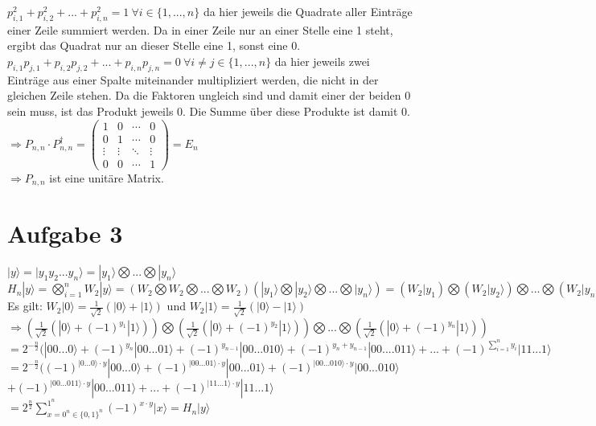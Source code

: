 \documentclass[a4paper]{scrartcl}
\begin{document}
$p_{i,1}^2+p_{i,2}^2+...+p_{i,n}^2=1~\forall i \in \{1,...,n\}$ da hier jeweils die Quadrate aller Einträge einer Zeile summiert werden. Da in einer Zeile nur an einer Stelle eine 1 steht, ergibt das Quadrat nur an dieser Stelle eine 1, sonst eine 0.\\
$p_{i,1}p_{j,1}+p_{i,2}p_{j,2}+...+p_{i,n}p_{j,n} = 0~\forall i\neq j \in \{1,...,n\}$ da hier jeweils zwei Einträge aus einer Spalte miteinander multipliziert werden, die nicht in der gleichen Zeile stehen. Da die Faktoren ungleich sind und damit einer der beiden 0 sein muss, ist das Produkt jeweils 0. Die Summe über diese Produkte ist damit 0.\\
$\Rightarrow P_{n,n} \cdot P_{n,n}^{\dagger} =
\begin{pmatrix}
1 & 0 & \cdots & 0 \\
0 & 1 & \cdots & 0 \\
\vdots  & \vdots  & \ddots & \vdots  \\
0 & 0 & \cdots & 1 
\end{pmatrix} = E_n$\\
$\Rightarrow P_{n,n}$ ist eine unitäre Matrix.

\newpage
\section*{Aufgabe 3}
$|y\rangle = |y_1 y_2...y_n\rangle = |y_1\rangle \bigotimes ... \bigotimes |y_n\rangle$\\
$H_n|y\rangle =\bigotimes_{i=1}^nW_2|y\rangle =(W_2\bigotimes W_2\bigotimes ... \bigotimes W_2)(|y_1\rangle \bigotimes |y_2\rangle \bigotimes ... \bigotimes |y_n\rangle) = (W_2|y_1)\bigotimes (W_2|y_2\rangle)\bigotimes ... \bigotimes (W_2|y_n\rangle)$\\
Es gilt: $W_2|0\rangle = \frac{1}{\sqrt{2}}(|0\rangle + |1\rangle)$ und $W_2|1\rangle = \frac{1}{\sqrt{2}}(|0\rangle - |1\rangle)$\\
$\Rightarrow (\frac{1}{\sqrt{2}}(|0\rangle + (-1)^{y_1}|1\rangle ))\bigotimes (\frac{1}{\sqrt{2}}(|0\rangle + (-1)^{y_2} |1\rangle)) \bigotimes ... \bigotimes (\frac{1}{\sqrt{2}}(|0\rangle + (-1)^{y_n}|1\rangle))$\\
$=  2^{-\frac{n}{2}}(|00...0\rangle + (-1)^{y_n}|00...01\rangle+ (-1)^{y_{n-1}}|00...010\rangle + (-1)^{y_n+y_{n-1}}|00....011\rangle + ... + (-1)^{\sum_{i=1}^n y_i}|11...1\rangle$\\
$=  2^{-\frac{n}{2}}((-1)^{|0...0\rangle \cdot y }|00...0\rangle + (-1)^{|00...01\rangle \cdot y}|00...01\rangle+ (-1)^{|00...010\rangle \cdot y}|00...010\rangle$\\
$ + (-1)^{|00...011\rangle \cdot y}|00...011\rangle + ... + (-1)^{|11...1\rangle \cdot y}|11...1\rangle$\\
$= 2^\frac{n}{2}\sum_{x = 0^n \in \{0,1\}^n}^{1^n}(-1)^{x\cdot y}|x\rangle = H_n|y\rangle$
\end{document}
